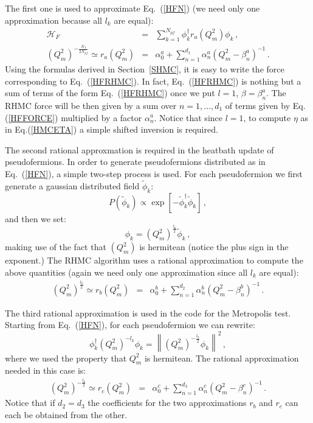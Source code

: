 \documentclass{article}[12pt]
\begin{document}
The first one is used to approximate Eq.~(\ref{HFN}) (we need only one approximation because all $l_k$ are equal):
\begin{eqnarray}
\mathcal{H}_F &=& \sum_{k=1}^{N_{pf}} \phi_k^\dagger r_{a}( Q_m^2 )\phi_k \, , \label{HFRHMC}\\ 
( Q_m^2 )^{-\frac{N_f}{2N_{pf}}} \simeq r_{a}(Q_m^2) &=& \alpha_0^a + \sum_{n=1}^{d_{1}} \alpha_n^a ( Q^2_m - \beta_n^a )^{-1} \, .
\end{eqnarray}
Using the formulas derived in Section~\ref{SHMC}, it is easy to write the force corresponding to Eq.~(\ref{HFRHMC}).
In fact, Eq.~(\ref{HFRHMC}) is nothing but a sum of terms of the form Eq.~(\ref{HFRHMC}) once we put $l=1$, $\beta=\beta_n^a$.
The RHMC force will be then given by a sum over $n=1,\dots,d_1$ of terms given by Eq.(\ref{HFFORCE}) multiplied by a factor $\alpha_n^a$.
Notice that since $l=1$, to compute $\eta$ as in Eq.(\ref{HMCETA}) a simple shifted inversion is required.

The second rational approxmation is required in the heatbath update of pseudofermions.
In order to generate pseudofermions distributed as in Eq.~(\ref{HFN}), a simple two-step process is used.
For each pseudofermion we first generate a gaussian distributed field $\tilde\phi_k$:
\begin{equation}
P(\tilde\phi_k)\propto \exp [ -\tilde\phi_k^\dagger \tilde\phi_k ] \, ,
\end{equation}
and then we set:
\begin{equation}
\phi_k = (Q_m^2)^{\frac{l_k}{2}} \tilde\phi_k \, ,
\end{equation}
making use of the fact that $(Q_m^2)$ is hermitean (notice the plus sign in the exponent.) 
The RHMC algorithm uses a rational approximation to compute the above quantities (again we need only one 
approximation since all $l_k$ are equal):
\begin{eqnarray}
( Q_m^2 )^{\frac{l_k}{2}} \simeq r_{b}(Q_m^2) &=& \alpha_0^b + \sum_{n=1}^{d_{2}} \alpha_n^b ( Q^2_m - \beta_n^b )^{-1} \, .
\end{eqnarray}

The third rational approximation is used in the code for the Metropolis test.
Starting from Eq.~(\ref{HFN}), for each pseudofermion we can rewrite:
\begin{equation}
\phi_k^\dagger ( Q_m^2 )^{-l_k}\phi_k = \left\| (Q_m^2)^{-\frac{l_k}{2}} \phi_k \right\|^2\, ,
\end{equation}
where we used the property that $Q_m^2$ is hermitean.
The rational approximation needed in this case is:
\begin{eqnarray}
( Q_m^2 )^{-\frac{l_k}{2}} \simeq r_{c}(Q_m^2) &=& \alpha_0^c + \sum_{n=1}^{d_{3}} \alpha_n^c ( Q^2_m - \beta_n^c )^{-1} \, .
\end{eqnarray}
Notice that if $d_2=d_3$ the coefficients for the two approximations $r_b$ and $r_c$ can each be obtained from the other.
\end{document}
